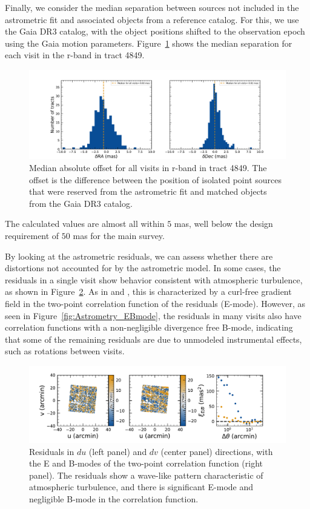 Finally, we consider the median separation between sources not included in the astrometric fit and associated objects from a reference catalog.
For this, we use the Gaia DR3 catalog, with the object positions shifted to the observation epoch using the Gaia motion parameters.
Figure~\ref{fig:AA1} shows the median separation for each visit in the r-band in tract 4849.
\begin{figure}[htb!]
\centering
\includegraphics[width=0.98\linewidth]{Astrometry_AA1.pdf}
\caption{Median absolute offset for all visits in r-band in tract 4849. The offset is the difference between the position of isolated point sources that were reserved from the astrometric fit and matched objects from the Gaia DR3 catalog.}
\label{fig:AA1}
\vspace{0.1cm}
\end{figure}


The calculated values are almost all within $5$\xspace mas, well below the design requirement of $50$\xspace mas for the main survey.

By looking at the astrometric residuals, we can assess whether there are distortions not accounted for by the astrometric model.
In some cases, the residuals in a single visit show behavior consistent with atmospheric turbulence, as shown in Figure~\ref{fig:Astrometry_Emode}.
As in \citet{Leget2021} and \citet{Fortino2021}, this is characterized by a curl-free gradient field in the two-point correlation function of the residuals (E-mode). However, as seen in Figure~\ref{fig:Astrometry_EBmode}, the residuals in many visits also have correlation functions with a non-negligible divergence free B-mode, indicating that some of the remaining residuals are due to unmodeled instrumental effects, such as rotations between visits.
\begin{figure}[htb!]
\centering
\includegraphics[width=0.98\linewidth]{figures/Astrometry_2024120200359.pdf}
\caption{\small Residuals in $du$ (left panel) and $dv$ (center panel) directions, with the E and B-modes of the two-point correlation function (right panel). The residuals show a wave-like pattern characteristic of atmospheric turbulence, and there is significant E-mode and negligible B-mode in the correlation function.}
\label{fig:Astrometry_Emode}
\vspace{0.1cm}
\end{figure}


